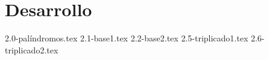 \part{Desarrollo}

\setcounter{section}{-1}

{2.0-palíndromos.tex}
\newpage
{2.1-base1.tex}
\newpage
{2.2-base2.tex}
\newpage
{2.5-triplicado1.tex}
\newpage
{2.6-triplicado2.tex}


\newpage